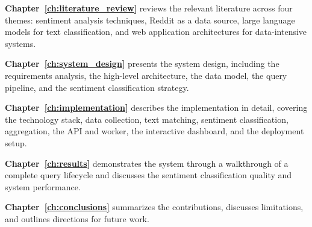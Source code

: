 \begin{sloppypar}
\textbf{Chapter~\ref{ch:literature_review}} reviews the relevant literature across four themes: sentiment analysis techniques, Reddit as a data source, large language models for text classification, and web application architectures for data-intensive systems.

\textbf{Chapter~\ref{ch:system_design}} presents the system design, including the requirements analysis, the high-level architecture, the data model, the query pipeline, and the sentiment classification strategy.

\textbf{Chapter~\ref{ch:implementation}} describes the implementation in detail, covering the technology stack, data collection, text matching, sentiment classification, aggregation, the API and worker, the interactive dashboard, and the deployment setup.

\textbf{Chapter~\ref{ch:results}} demonstrates the system through a walkthrough of a complete query lifecycle and discusses the sentiment classification quality and system performance.

\textbf{Chapter~\ref{ch:conclusions}} summarizes the contributions, discusses limitations, and outlines directions for future work.
\end{sloppypar}
